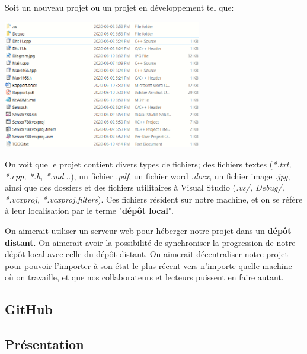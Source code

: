 \documentclass{article}
\begin{document}
\begin{flushleft}
Soit un nouveau projet ou un projet en développement tel que:\newline
\end{flushleft}

\includegraphics[width=0.65\textwidth, center]{Project_presentation}

\begin{flushleft}
On voit que le projet contient divers types de fichiers; des fichiers textes (\textit{*.txt, *.cpp, *.h, *.md}...), un fichier \textit{.pdf}, un fichier word \textit{.docx}, un fichier image \textit{.jpg}, ainsi que des dossiers et des fichiers utilitaires à Visual Studio (\textit{.vs/, Debug/, *.vcxproj, *.vcxproj.filters}). Ces fichiers résident sur notre machine, et on se réfère à leur localisation par le terme "\textbf{dépôt local}".\newline

On aimerait utiliser un serveur web pour héberger notre projet dans un \textbf{dépôt distant}. On aimerait avoir la possibilité de synchroniser la progression de notre dépôt local avec celle du dépôt distant. On aimerait décentraliser notre projet pour pouvoir l'importer à son état le plus récent vers n'importe quelle machine où on travaille, et que nos collaborateurs et lecteurs puissent en faire autant.
\end{flushleft}

\begin{center}\section{GitHub}\end{center}
\subsection{Présentation}
\end{document}
